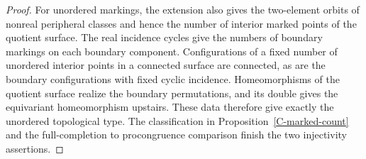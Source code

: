 \begin{proof}
For unordered markings, the extension also gives the two-element
orbits of nonreal peripheral classes and hence the number of
interior marked points of the quotient surface. The real incidence
cycles give the numbers of boundary markings on each boundary
component. Configurations of a fixed number of unordered interior
points in a connected surface are connected, as are the boundary
configurations with fixed cyclic incidence. Homeomorphisms of the
quotient surface realize the boundary permutations, and its double
gives the equivariant homeomorphism upstairs. These data therefore
give exactly the unordered topological type. The classification
in Proposition~\ref{C-marked-count} and the full-completion to
procongruence comparison finish the two injectivity assertions.
\end{proof}

